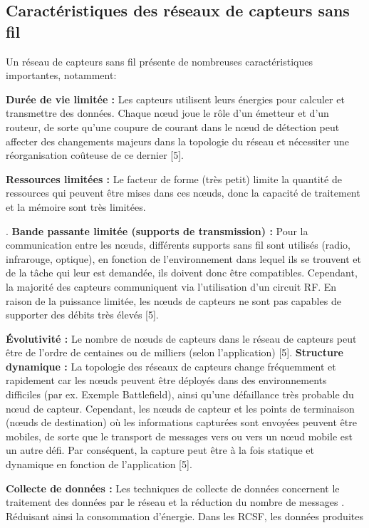 \documentclass[paper=a4, fontsize=11pt]{scrartcl}
\numberwithin{equation}{section}		%
\numberwithin{figure}{section}			%
\numberwithin{table}{section}				%
\begin{document}
\subsection{Caractéristiques des réseaux de capteurs sans fil }
Un réseau de capteurs sans fil présente de nombreuses caractéristiques importantes,
notamment:\par
\textbf{Durée de vie limitée :}
 Les capteurs utilisent leurs énergies pour calculer et transmettre des données.
Chaque nœud joue le rôle d'un émetteur et d'un routeur, de sorte qu'une coupure de
courant dans le nœud de détection peut affecter des changements majeurs dans la
topologie du réseau et nécessiter une réorganisation coûteuse de ce dernier [5].\par
\textbf{Ressources limitées :}
Le facteur de forme (très petit) limite la quantité de ressources qui peuvent être
mises dans ces nœuds, donc la capacité de traitement et la mémoire sont très limitées.\par.
\textbf{Bande passante limitée (supports de transmission) :}
Pour la communication entre les nœuds, différents supports sans fil sont utilisés
(radio, infrarouge, optique), en fonction de l'environnement dans lequel ils se
trouvent et de la tâche qui leur est demandée, ils doivent donc être compatibles.
Cependant, la majorité des capteurs communiquent via l'utilisation d'un circuit RF.
En raison de la puissance limitée, les nœuds de capteurs ne sont pas capables de
supporter des débits très élevés [5].\par
\textbf{Évolutivité :}
Le nombre de nœuds de capteurs dans le réseau de capteurs peut être de l'ordre de
centaines ou de milliers (selon l'application) [5].
\textbf{Structure dynamique :}
La topologie des réseaux de capteurs change fréquemment et rapidement car les
nœuds peuvent être déployés dans des environnements difficiles (par ex.
Exemple Battlefield), ainsi qu'une défaillance très probable du nœud de capteur.
Cependant, les nœuds de capteur et les points de terminaison (nœuds de destination)
où les informations capturées sont envoyées peuvent être mobiles, de sorte que le
transport de messages vers ou vers un nœud mobile est un autre défi. Par
conséquent, la capture peut être à la fois statique et dynamique en fonction de
l'application [5].\par
\textbf{ Collecte de données :}
Les techniques de collecte de données concernent le traitement des données par le
réseau et la réduction du nombre de messages .
Réduisant ainsi la consommation d'énergie. Dans les RCSF, les données produites
\end{document}
